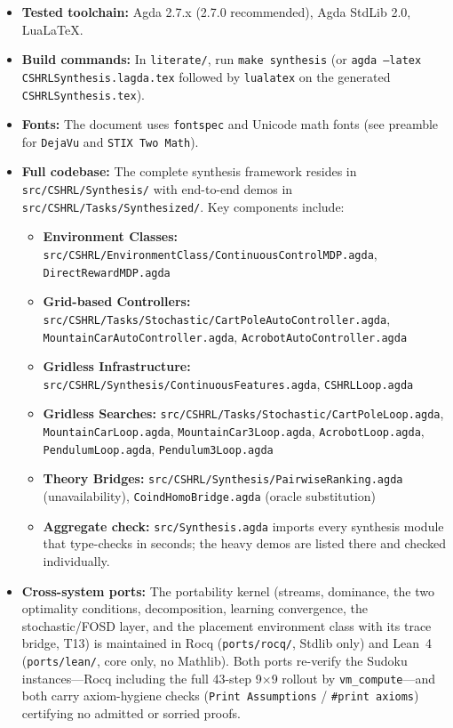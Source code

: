 \documentclass[9pt,a4paper]{article}
\newcommand{\fpath}[1]{\nolinkurl{#1}}
\theoremstyle{plain}
\theoremstyle{definition}
\theoremstyle{remark}
\begin{document}
\begin{itemize}
\item \textbf{Tested toolchain:} Agda 2.7.x (2.7.0 recommended), Agda StdLib 2.0, Lua\LaTeX.
\item \textbf{Build commands:} In \texttt{literate/}, run \texttt{make synthesis} (or \texttt{agda --latex CSHRLSynthesis.lagda.tex} followed by \texttt{lualatex} on the generated \texttt{CSHRLSynthesis.tex}).
\item \textbf{Fonts:} The document uses \texttt{fontspec} and Unicode math fonts (see preamble for \texttt{DejaVu} and \texttt{STIX Two Math}).
\item \textbf{Full codebase:} The complete synthesis framework resides in \fpath{src/CSHRL/Synthesis/} with end-to-end demos in \fpath{src/CSHRL/Tasks/Synthesized/}. Key components include:
  \begin{itemize}
    \item \textbf{Environment Classes:} \fpath{src/CSHRL/EnvironmentClass/ContinuousControlMDP.agda}, \fpath{DirectRewardMDP.agda}
    \item \textbf{Grid-based Controllers:} \fpath{src/CSHRL/Tasks/Stochastic/CartPoleAutoController.agda}, \fpath{MountainCarAutoController.agda}, \fpath{AcrobotAutoController.agda}
    \item \textbf{Gridless Infrastructure:} \fpath{src/CSHRL/Synthesis/ContinuousFeatures.agda}, \fpath{CSHRLLoop.agda}
    \item \textbf{Gridless Searches:} \fpath{src/CSHRL/Tasks/Stochastic/CartPoleLoop.agda}, \fpath{MountainCarLoop.agda}, \fpath{MountainCar3Loop.agda}, \fpath{AcrobotLoop.agda}, \fpath{PendulumLoop.agda}, \fpath{Pendulum3Loop.agda}
    \item \textbf{Theory Bridges:} \fpath{src/CSHRL/Synthesis/PairwiseRanking.agda} (unavailability), \fpath{CoindHomoBridge.agda} (oracle substitution)
    \item \textbf{Aggregate check:} \fpath{src/Synthesis.agda} imports every synthesis module that type-checks in seconds; the heavy demos are listed there and checked individually.
  \end{itemize}
\item \textbf{Cross-system ports:} The portability kernel (streams, dominance, the two optimality conditions, decomposition, learning convergence, the stochastic/FOSD layer, and the placement environment class with its trace bridge, T13) is maintained in Rocq (\fpath{ports/rocq/}, Stdlib only) and Lean~4 (\fpath{ports/lean/}, core only, no Mathlib).  Both ports re-verify the Sudoku instances---Rocq including the full 43-step 9$\times$9 rollout by \texttt{vm\_compute}---and both carry axiom-hygiene checks (\texttt{Print Assumptions} / \texttt{\#print axioms}) certifying no admitted or sorried proofs.
\end{itemize}
\end{document}
